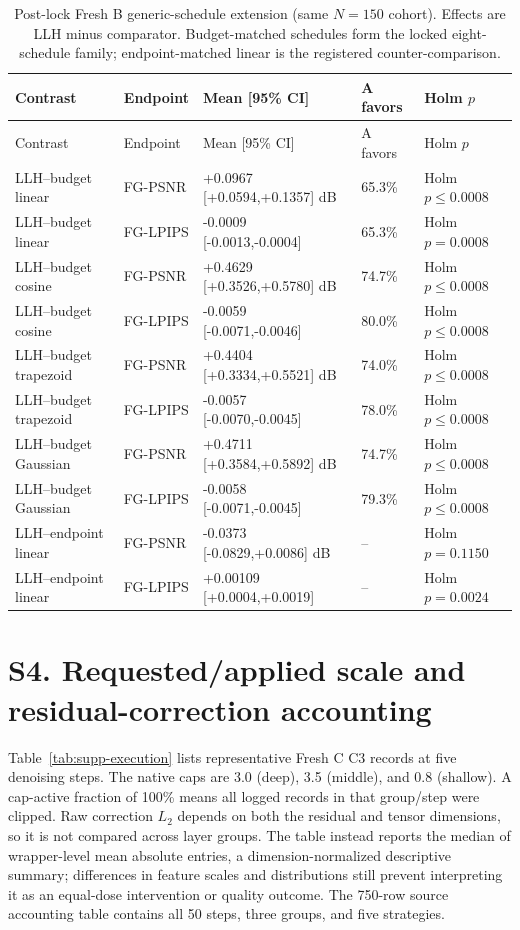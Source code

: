 \documentclass[11pt]{article}
\begin{document}
\clearpage
\begingroup\scriptsize
\begin{longtable}{p{3.4cm}p{1.7cm}p{4.4cm}p{1.3cm}p{2.4cm}}
\caption{Post-lock Fresh B generic-schedule extension (same $N=150$ cohort). Effects are LLH minus comparator. Budget-matched schedules form the locked eight-schedule family; endpoint-matched linear is the registered counter-comparison.}\label{tab:supp-generic}\\
\toprule Contrast & Endpoint & Mean [95\% CI] & A favors & Holm $p$ \\
\midrule\endfirsthead
\toprule Contrast & Endpoint & Mean [95\% CI] & A favors & Holm $p$ \\
\midrule\endhead
LLH--budget linear & FG-PSNR & +0.0967 [+0.0594,+0.1357] dB & 65.3\% & Holm $p\leq0.0008$ \\
LLH--budget linear & FG-LPIPS & -0.0009 [-0.0013,-0.0004] & 65.3\% & Holm $p=0.0008$ \\
LLH--budget cosine & FG-PSNR & +0.4629 [+0.3526,+0.5780] dB & 74.7\% & Holm $p\leq0.0008$ \\
LLH--budget cosine & FG-LPIPS & -0.0059 [-0.0071,-0.0046] & 80.0\% & Holm $p\leq0.0008$ \\
LLH--budget trapezoid & FG-PSNR & +0.4404 [+0.3334,+0.5521] dB & 74.0\% & Holm $p\leq0.0008$ \\
LLH--budget trapezoid & FG-LPIPS & -0.0057 [-0.0070,-0.0045] & 78.0\% & Holm $p\leq0.0008$ \\
LLH--budget Gaussian & FG-PSNR & +0.4711 [+0.3584,+0.5892] dB & 74.7\% & Holm $p\leq0.0008$ \\
LLH--budget Gaussian & FG-LPIPS & -0.0058 [-0.0071,-0.0045] & 79.3\% & Holm $p\leq0.0008$ \\
LLH--endpoint linear & FG-PSNR & -0.0373 [-0.0829,+0.0086] dB & -- & Holm $p=0.1150$ \\
LLH--endpoint linear & FG-LPIPS & +0.00109 [+0.0004,+0.0019] & -- & Holm $p=0.0024$ \\
\bottomrule
\end{longtable}
\endgroup

\clearpage
\section*{S4. Requested/applied scale and residual-correction accounting}
Table~\ref{tab:supp-execution} lists representative Fresh C C3 records at five denoising steps. The native caps are 3.0 (deep), 3.5 (middle), and 0.8 (shallow). A cap-active fraction of 100\% means all logged records in that group/step were clipped. Raw correction $L_2$ depends on both the residual and tensor dimensions, so it is not compared across layer groups. The table instead reports the median of wrapper-level mean absolute entries, a dimension-normalized descriptive summary; differences in feature scales and distributions still prevent interpreting it as an equal-dose intervention or quality outcome. The 750-row source accounting table contains all 50 steps, three groups, and five strategies.
\end{document}
